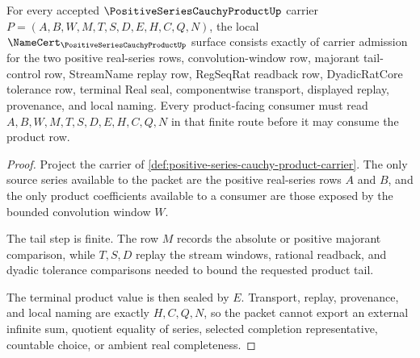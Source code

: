 \begin{theorem}
\label{thm:positive-series-cauchy-product-namecert-obligations}
For every accepted $\PositiveSeriesCauchyProductUp$ carrier $P=(A,B,W,M,T,S,D,E,H,C,Q,N)$, the local $\NameCert_{\PositiveSeriesCauchyProductUp}$ surface consists exactly of carrier admission for the two positive real-series rows, convolution-window row, majorant tail-control row, StreamName replay row, RegSeqRat readback row, DyadicRatCore tolerance row, terminal Real seal, componentwise transport, displayed replay, provenance, and local naming. Every product-facing consumer must read $A,B,W,M,T,S,D,E,H,C,Q,N$ in that finite route before it may consume the product row.
\end{theorem}
\begin{proof}
Project the carrier of \autoref{def:positive-series-cauchy-product-carrier}. The only source series available to the packet are the positive real-series rows $A$ and $B$, and the only product coefficients available to a consumer are those exposed by the bounded convolution window $W$.

The tail step is finite. The row $M$ records the absolute or positive majorant comparison, while $T,S,D$ replay the stream windows, rational readback, and dyadic tolerance comparisons needed to bound the requested product tail.

The terminal product value is then sealed by $E$. Transport, replay, provenance, and local naming are exactly $H,C,Q,N$, so the packet cannot export an external infinite sum, quotient equality of series, selected completion representative, countable choice, or ambient real completeness.
\end{proof}

